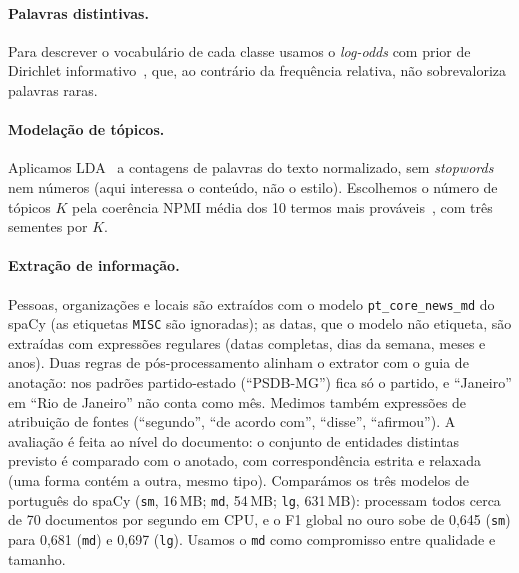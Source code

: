 \paragraph{Palavras distintivas.}
Para descrever o vocabulário de cada classe usamos o \emph{log-odds} com prior de Dirichlet
informativo~\cite{monroe2008}, que, ao contrário da frequência relativa, não sobrevaloriza
palavras raras.

\paragraph{Modelação de tópicos.}
Aplicamos LDA~\cite{blei2003} a contagens de palavras do texto normalizado, sem \emph{stopwords} nem
números (aqui interessa o conteúdo, não o estilo). Escolhemos o número de tópicos $K$ pela coerência
NPMI média dos 10 termos mais prováveis~\cite{roder2015}, com três sementes por $K$.

\paragraph{Extração de informação.}
Pessoas, organizações e locais são extraídos com o modelo \texttt{pt\_core\_news\_md} do spaCy
(as etiquetas \texttt{MISC} são ignoradas); as datas, que o modelo não etiqueta, são extraídas com
expressões regulares (datas completas, dias da semana, meses e anos). Duas regras de
pós-processamento alinham o extrator com o guia de anotação: nos padrões partido-estado
(``PSDB-MG'') fica só o partido, e ``Janeiro'' em ``Rio de Janeiro'' não conta como mês. Medimos também expressões de
atribuição de fontes (``segundo'', ``de acordo com'', ``disse'', ``afirmou''). A avaliação é feita
ao nível do documento: o conjunto de entidades distintas previsto é comparado com o anotado, com
correspondência estrita e relaxada (uma forma contém a outra, mesmo tipo).
Comparámos os três modelos de português do spaCy (\texttt{sm}, 16\,MB; \texttt{md}, 54\,MB;
\texttt{lg}, 631\,MB): processam todos cerca de 70 documentos por segundo em CPU, e o F1 global no
ouro sobe de 0,645 (\texttt{sm}) para 0,681 (\texttt{md}) e 0,697 (\texttt{lg}). Usamos o
\texttt{md} como compromisso entre qualidade e tamanho.
